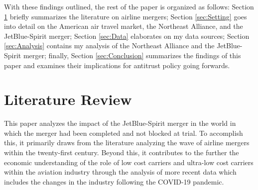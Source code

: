 \documentclass{article}
\begin{document}

	With these findings outlined, the rest of the paper is organized as follows: Section \ref{sec:Literature} briefly summarizes the literature on airline mergers; Section \ref{sec:Setting} goes into detail on the American air travel market, the Northeast Alliance, and the JetBlue-Spirit merger; Section \ref{sec:Data} elaborates on my data sources; Section \ref{sec:Analysis} contains my analysis of the Northeast Alliance and the JetBlue-Spirit merger; finally, Section \ref{sec:Conclusion} summarizes the findings of this paper and examines their implications for antitrust policy going forwards. 
  
	\section{Literature Review}
	\label{sec:Literature}

    This paper analyzes the impact of the JetBlue-Spirit merger in the world in which the merger had been completed and not blocked at trial. To accomplish this, it primarily draws from the literature analyzing the wave of airline mergers within the twenty-first century.  Beyond this, it contributes to the further the economic understanding of the role of low cost carriers and ultra-low cost carriers within the aviation industry through the analysis of more recent data which includes the changes in the industry following the COVID-19 pandemic.
	
\end{document}
